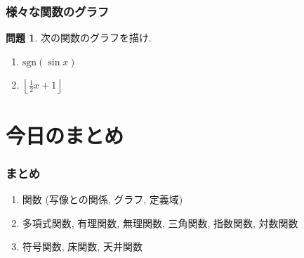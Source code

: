 \documentclass[dvipdfmx,cjk,10.2pt]{beamer}
\theoremstyle{definition}
\newtheorem{Prob}[Thm]{問題}
\begin{document}




\begin{frame}
\frametitle{様々な関数のグラフ}   

\begin{Prob}
次の関数のグラフを描け. 
\begin{enumerate}
\item $\mathrm{sgn}(\sin x)$
\item $\left \lfloor{\frac{1}{2}x+1}\right \rfloor $
\end{enumerate}
\end{Prob}

\end{frame}







\section{今日のまとめ}
\begin{frame}
\frametitle{まとめ}   


\begin{enumerate}
\item 関数 (写像との関係, グラフ, 定義域)
\item 多項式関数, 有理関数, 無理関数, 三角関数, 指数関数, 対数関数
\item 符号関数, 床関数, 天井関数
\end{enumerate} 


\end{frame}
\end{document}
